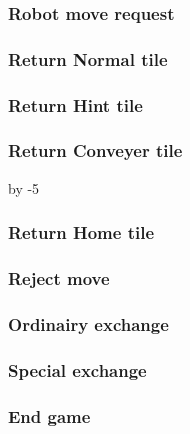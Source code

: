 	\subsubsection{Robot move request}
	

	\subsubsection{Return Normal tile}
	

	\subsubsection{Return Hint tile}
	

	\subsubsection{Return Conveyer tile}
	

	\advance{} by -5

	\subsubsection{Return Home tile}
	


	\subsubsection{Reject move}
	


	\subsubsection{Ordinairy exchange}
	
	
	\subsubsection{Special exchange}
	
	
	\subsubsection{End game}
	 
